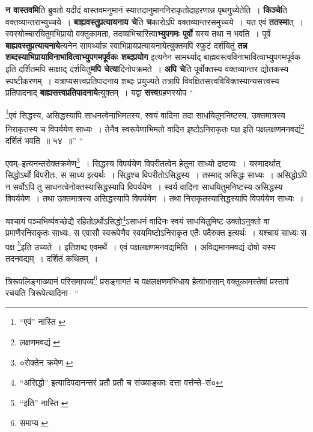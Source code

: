 \documentclass[article,12pt,a4paper]{memoir}
\begin{document}
	  \pstart \textbf{न वास्तवमि}ति ब्रुवतो यदीदं वास्तवमनुमानं स्यात्तदानुमाननिराकृतोदाहरणान्न पृथगुच्येतेति । \textbf{किञ्चे}ति वक्तव्यान्तराभ्युच्चये । \textbf{बाह्यवस्तुप्रत्यायनाय चे}ति \textbf{च}कारोऽपि वक्तव्यान्तरसमुच्चये । यत एवं \textbf{ततस्मा}त् । स्वस्योच्चारयितुमभिप्रायो वक्तुकामता, तदव्यभिचारित्वा\textbf{भ्युपगमः पूर्वो} यस्य तथा न भवति । पूर्वं \textbf{बाह्यवस्तुप्रत्यायनाये}त्यनेन सामर्थ्यान्न स्वाभिप्रायप्रत्यायनायेत्युक्तमपि स्फुटं दर्शयितुं \textbf{तन्न शब्दस्याभिप्रायाविनाभावित्वाभ्युपगमपूर्वकः शब्दप्रयोग} इत्यनेन सामर्थ्याद् बाह्मवस्त्वविनाभावित्वाभ्युपगमपूर्वक इति दर्शितमपि साक्षाद् दर्शयितु\textbf{मपि चेत्या}दिनोपक्रमते । \textbf{अपि चे}ति पूर्वोक्तस्य वक्तव्यान्तर द्योतकस्य स्पष्टीकरणम् । यत्राप्यसत्त्वप्रतिपादनाय शब्दः प्रयुज्यते तत्रापि विवक्षितसत्त्वविविक्तस्यान्यसत्त्वस्य प्रतिपादनाद् \textbf{बाह्यसत्त्वप्रतिपादनाये}त्युक्तम् । यद्वा \textbf{सत्त्व}ग्रहणस्योप  \leavevmode{} “
	  
	\footnote{“एवं” नास्ति \cite{dp-msB} \cite{dp-edP} \cite{dp-edH}}\-एवं सिद्धस्य, असिद्धस्यापि साधनत्वेनाभिमतस्य, स्वयं वादिना तदा साधयितुमनिष्टस्य, उक्तमात्रस्य निराकृतस्य च विपर्ययेण साध्यः । तेनैव स्वरूपेणाभिमतो वादिन इष्टोऽनिराकृतः पक्ष इति पक्षलक्षणमनवद्यं\footnote{लक्षणमवद्यं \cite{dp-msB} \cite{dp-edP}} दर्शितं भवति ॥ ५४ ॥” “
	  
	एवम्--इत्यनन्तरोक्तक्रमेण\footnote{०रोक्तेन क्रमेण \cite{dp-msB} \cite{dp-msC} \cite{dp-msD}} । सिद्धस्य विपर्ययेण विपरीतत्वेन हेतुना साध्यो द्रष्टव्यः । यस्मादर्थात् सिद्धोऽर्थो विपरीतः, स साध्य इत्यर्थः । सिद्धश्च विपरीतोऽसिद्धस्य । तस्माद् असिद्धः साध्यः । असिद्धोऽपि न सर्वोऽपि तु साधनत्वेनोक्तस्यासिद्धस्यापि विपर्ययेण । स्वर्य वादिना साधयितुमनिष्टस्य असिद्धस्य विपर्ययेण । तथा उक्तमात्रस्य असिद्धस्यापि विपर्ययेण । तथा निराकृतस्यासिद्धस्यापि विपर्ययेण साध्यः । 
	  
	यश्चायं पञ्चभिर्व्यवच्छेद्यै रहितोऽर्थोऽसिद्धो\footnote{“असिद्धो” इत्यादिपदानन्तरं \cite{dp-msA} प्रतौ \cite{dp-msD} प्रतौ च संख्याङ्काः दत्ता वर्त्तन्ते--सं०}\-ऽसाधनं वादिनः स्वयं साधयितुमिष्ट उक्तोऽनुक्तो वा प्रमाणैरनिराकृतः साध्यः, स एवासौ स्वरूपेणैव स्वयमिष्टोऽनिराकृत एतैः पदैरुक्त इत्यर्थः । यश्चायं साध्यः स पक्ष \footnote{“इति” नास्ति \cite{dp-msA} \cite{dp-msB} \cite{dp-msD} \cite{dp-edP} \cite{dp-edH} \cite{dp-edE} \cite{dp-edN}}\-इति उच्यते । इतिशब्द एवमर्थे । एवं पक्षलक्षणमनवद्यमिति । अविद्यमानमवद्यं दोषो यस्य तदनवद्यम् । दर्शितं कथितम् । 
	  
	त्रिरूपलिङ्गाख्यानं परिसमापय्य\footnote{समाप्य \cite{dp-edE}} प्रसङ्गागतं च पक्षलक्षणमभिधाय हेत्वाभासान् वक्तुकामस्तेषां प्रस्तावं रचयति त्रिरूपेत्यादिना-- “
	  
\end{document}
